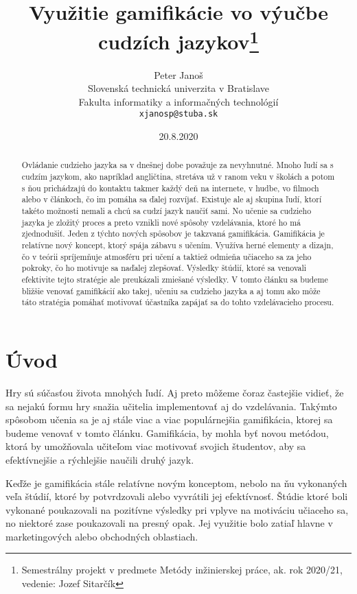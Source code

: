 \documentclass[10pt,oneside,slovak,a4paper]{article}
\title{Využitie gamifikácie vo výučbe cudzích jazykov\thanks{Semestrálny projekt v predmete Metódy inžinierskej práce, ak. rok 2020/21, vedenie: Jozef Sitarčík}} %
\author{Peter Janoš\\[2pt]
	{\small Slovenská technická univerzita v Bratislave}\\
	{\small Fakulta informatiky a informačných technológií}\\
	{\small \texttt{xjanosp@stuba.sk}}
	}
\date{\small 20.8.2020} %
\begin{document}
\maketitle

\begin{abstract}
Ovládanie cudzieho jazyka sa v dnešnej dobe považuje za nevyhnutné. Mnoho ľudí sa s cudzím jazykom, ako napríklad angličtina, stretáva už v ranom veku v školách a potom s ňou prichádzajú do kontaktu takmer každý deň na internete, v hudbe, vo filmoch alebo v článkoch, čo im pomáha sa ďalej rozvíjať. Existuje ale aj skupina ľudí, ktorí takéto možnosti nemali a chcú sa cudzí jazyk naučiť sami. No učenie sa cudzieho jazyka je zložitý proces a preto vznikli nové spôsoby vzdelávania, ktoré ho má zjednodušiť. Jeden z týchto nových spôsobov je takzvaná gamifikácia. Gamifikácia je relatívne nový koncept, ktorý spája zábavu s učením. Využíva herné elementy a dizajn, čo v teórii spríjemňuje atmosféru pri učení a taktiež odmieňa učiaceho sa za jeho pokroky, čo ho motivuje sa naďalej zlepšovať. Výsledky štúdií, ktoré sa venovali efektivite tejto stratégie ale preukázali zmiešané výsledky. V tomto článku sa budeme bližšie venovať gamifikácií ako takej, učeniu sa cudzieho jazyka a aj tomu ako môže táto stratégia pomáhať motivovať účastníka zapájať sa do tohto vzdelávacieho procesu.
\end{abstract}



\section{Úvod} \label{uvod}

Hry sú súčasťou života mnohých ľudí. Aj preto môžeme čoraz častejšie vidieť, že sa nejakú formu hry snažia učitelia implementovať aj do vzdelávania. Takýmto spôsobom učenia sa je aj stále viac a viac populárnejšia gamifikácia, ktorej sa budeme venovať v tomto článku. Gamifikácia, by mohla byť novou metódou, ktorá by umožňovala učiteľom viac motivovať svojich študentov, aby sa efektívnejšie a rýchlejšie naučili druhý jazyk. 

Keďže je gamifikácia stále relatívne novým konceptom, nebolo na ňu vykonaných veľa štúdií, ktoré by potvrdzovali alebo vyvrátili jej efektívnosť. Štúdie ktoré boli vykonané poukazovali na pozitívne výsledky pri vplyve na motiváciu učiaceho sa, no niektoré zase poukazovali na presný opak. Jej využitie bolo zatiaľ hlavne v marketingových alebo obchodných oblastiach. 
\end{document}
